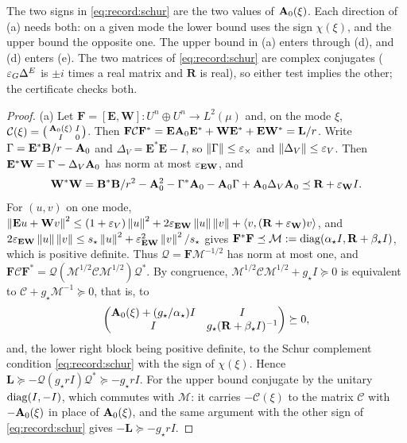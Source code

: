 The two signs in \eqref{eq:record:schur} are the two values of $\mathbf A_{0}(\xi)$. Each
direction of (a) needs both: on a given mode the lower bound uses the sign
$\chi(\xi)$, and the upper bound the opposite one. The upper bound in (a) enters
through (d), and (d) enters (e). The two matrices of \eqref{eq:record:schur} are
complex conjugates ($\varepsilon_G\Delta^E$ is $\pm i$ times a real matrix and $\mathbf R$ is real),
so either test implies the other; the certificate checks both.

\begin{proof}
(a) Let $\mathbf F=[\mathbf E,\mathbf W]\colon U^n\oplus U^n\to L^2(\mu)$ and, on the mode $\xi$,
$\mathcal C(\xi)=\begin{psmallmatrix}\mathbf A_{0}(\xi)&I\\ I&0\end{psmallmatrix}$. Then
$\mathbf F\mathcal C\mathbf F^*=\mathbf E\mathbf A_{0}\mathbf E^*+\mathbf W\mathbf E^*+\mathbf E\mathbf W^*=\mathbf L/r$. Write
$\Gamma=\mathbf E^*\mathbf B/r-\mathbf A_{0}$ and $\Delta_V=\mathbf E^*\mathbf E-I$, so $\left\|\Gamma\right\|\le\varepsilon_\times$
and $\left\|\Delta_V\right\|\le\varepsilon_V$. Then $\mathbf E^*\mathbf W=\Gamma-\Delta_V\mathbf A_{0}$ has norm at most
$\varepsilon_{\mathbf{EW}}$, and
\[
  \mathbf W^*\mathbf W=\mathbf B^*\mathbf B/r^2-\mathbf A_{0}^2-\Gamma^*\mathbf A_{0}-\mathbf A_{0}\Gamma+\mathbf A_{0}\Delta_V\mathbf A_{0}
  \preceq\mathbf R+\varepsilon_{\mathbf W}I .
\]
For $(u,v)$ on one mode,
$\left\|\mathbf Eu+\mathbf Wv\right\|^2\le(1+\varepsilon_V)\left\|u\right\|^2+2\varepsilon_{\mathbf{EW}}\left\|u\right\|\left\|v\right\|
+\left\langle v,(\mathbf R+\varepsilon_{\mathbf W})v\right\rangle$, and
$2\varepsilon_{\mathbf{EW}}\left\|u\right\|\left\|v\right\|\le s_\star\left\|u\right\|^2+\varepsilon_{\mathbf{EW}}^2\left\|v\right\|^2/s_\star$ gives
$\mathbf F^*\mathbf F\preceq\mathcal M:=\operatorname{diag}(\alpha_\star I,\mathbf R+\beta_\star I)$, which is positive definite.
Thus $\mathcal Q=\mathbf F\mathcal M^{-1/2}$ has norm at most one, and
$\mathbf F\mathcal C\mathbf F^*=\mathcal Q(\mathcal M^{1/2}\mathcal C\mathcal M^{1/2})\mathcal Q^*$. By congruence,
$\mathcal M^{1/2}\mathcal C\mathcal M^{1/2}+g_\star I\succeq0$ is equivalent to
$\mathcal C+g_\star\mathcal M^{-1}\succeq0$, that is, to
\[
  \begin{pmatrix}\mathbf A_{0}(\xi)+(g_\star/\alpha_\star)I&I\\ I&g_\star(\mathbf R+\beta_\star I)^{-1}\end{pmatrix}\succeq0,
\]
and, the lower right block being positive definite, to the Schur complement
condition \eqref{eq:record:schur} with the sign of $\chi(\xi)$. Hence
$\mathbf L\succeq-\mathcal Q(g_\star rI)\mathcal Q^*\succeq-g_\star rI$. For the upper bound conjugate by
the unitary $\operatorname{diag}(I,-I)$, which commutes with $\mathcal M$: it carries $-\mathcal C(\xi)$ to the
matrix $\mathcal C$ with $-\mathbf A_{0}(\xi)$ in place of $\mathbf A_{0}(\xi)$, and the same argument with
the other sign of \eqref{eq:record:schur} gives $-\mathbf L\succeq-g_\star rI$.


\end{proof}
